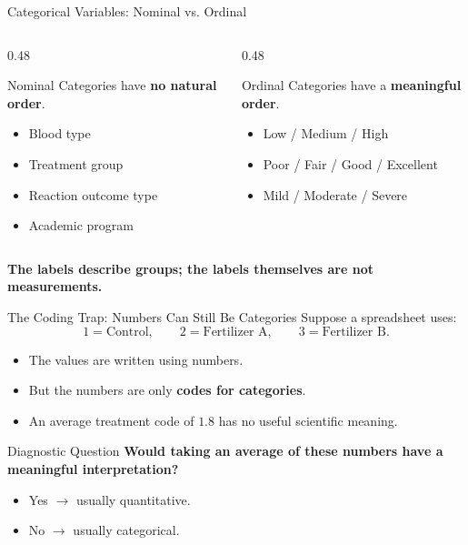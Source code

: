 \documentclass[aspectratio=169]{beamer}
\begin{document}
\begin{frame}{Categorical Variables: Nominal vs. Ordinal}
  \begin{columns}[T]
    \begin{column}{0.48\textwidth}
      \begin{block}{Nominal}
        Categories have \textbf{no natural order}.
        \begin{itemize}
          \item Blood type
          \item Treatment group
          \item Reaction outcome type
          \item Academic program
        \end{itemize}
      \end{block}
    \end{column}
    \begin{column}{0.48\textwidth}
      \begin{block}{Ordinal}
        Categories have a \textbf{meaningful order}.
        \begin{itemize}
          \item Low / Medium / High
          \item Poor / Fair / Good / Excellent
          \item Mild / Moderate / Severe
        \end{itemize}
      \end{block}
    \end{column}
  \end{columns}
  \vspace{0.2cm}
  \centering
  \textbf{The labels describe groups; the labels themselves are not measurements.}
\end{frame}

\begin{frame}{The Coding Trap: Numbers Can Still Be Categories}
  Suppose a spreadsheet uses:
  \[
    1 = \text{Control}, \qquad 2 = \text{Fertilizer A}, \qquad 3 = \text{Fertilizer B}.
  \]
  \begin{itemize}
    \item The values are written using numbers.
    \item But the numbers are only \textbf{codes for categories}.
    \item An average treatment code of $1.8$ has no useful scientific meaning.
  \end{itemize}
  \begin{alertblock}{Diagnostic Question}
    \textbf{Would taking an average of these numbers have a meaningful interpretation?}
    \begin{itemize}
      \item Yes $\rightarrow$ usually quantitative.
      \item No $\rightarrow$ usually categorical.
    \end{itemize}
  \end{alertblock}
\end{frame}
\end{document}
